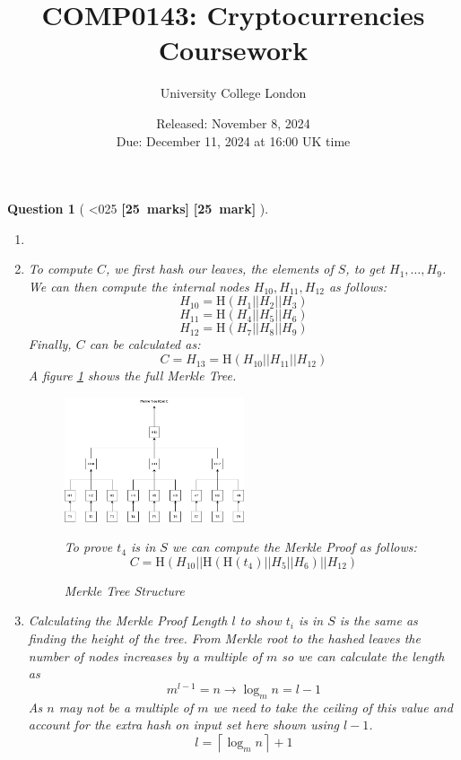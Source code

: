 \documentclass[a4paper]{article}
\theoremstyle{que}
\newtheorem{question}{Question}
\newcommand{\fixoffset}{\mbox{}\vspace*{-\bigskipamount}\vspace*{-\medskipamount}}
\newcommand\points[1]{%
\ifnum1<0#1\relax%
    {\bf \small [#1~marks]}%
  \else%
    {\bf \small [#1~mark]}%
  \fi%
}%
\newcommand{\module}{COMP0143: Cryptocurrencies}
\newcommand{\university}{University College London}
\newcommand{\assessment}{Coursework}
\newcommand{\releaseDate}{November 8, 2024}
\newcommand{\dueDate}{December 11, 2024 at 16:00 UK time}
\begin{document}
\title{\module\\[0.25cm]\assessment}
\author{\university}
\date{Released: \releaseDate\\[0.25cm]Due: \dueDate}
\maketitle

\newpage


\begin{question}[\points{25}]
  \fixoffset
  \begin{enumerate}[label=(\alph*)]
    \item 
    \item[(i)] To compute \( C \), we first hash our leaves, the elements of \( S \), to get \( H_1, \ldots, H_9 \). We can then compute the internal nodes \( H_{10}, H_{11}, H_{12} \) as follows:
\[
H_{10} = \text{H}(H_1 || H_2 || H_3)
\]
\[
H_{11} = \text{H}(H_4 || H_5 || H_6)
\]
\[
H_{12} = \text{H}(H_7 || H_8 || H_9)
\]
Finally, \( C \) can be calculated as:
\[
C = H_{13} = \text{H}(H_{10} || H_{11} || H_{12})
\]
A figure \ref{fig:merkle_tree} shows the full Merkle Tree.
\begin{figure}[h!]
    \centering
    \includegraphics[width=0.5\textwidth]{Merkle Tree example.drawio.png} %
    \caption{Merkle Tree Structure}
    \label{fig:merkle_tree}
To prove \( t_4 \) is in \( S \) we can compute the Merkle Proof as follows:
\[
C = \text{H}(H_{10}||\text{H}(\text{H}(t_4)||H_5||H_6)||H_{12})
\]

\end{figure}
    \item[(ii)] Calculating the Merkle Proof Length \(l\) to show \(t_i\) is in \(S\) is the same as finding the height of the tree. From Merkle root to the hashed leaves the number of nodes increases by a multiple of \(m\) so we can calculate the length as \[m^{l-1} = n \rightarrow \log_m n = l - 1\] As \(n\) may not be a multiple of \(m\) we need to take the ceiling of this value and account for the extra hash on input set here shown using \(l-1\). \[ l = \left\lceil \log_m n \right\rceil + 1\]
    

\end{enumerate}
\end{question}
\end{document}

